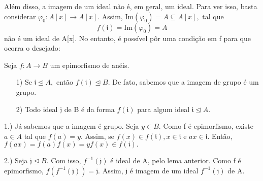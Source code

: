 \documentclass[algebraII_notes.tex]{subfiles}
\begin{document}
Além disso, a imagem de um ideal não é, em geral, um ideal. Para ver isso, basta considerar \(\varphi_{0}:A[x]\rightarrow A[x].\)
Assim, \(\mathrm{Im}(\varphi_{0}) = A\subseteq A[x],\) tal que
\[
	f(\mathfrak{i}) = \mathrm{Im}(\varphi_{0}) = A
\]
não é um ideal de A[x]. No entanto, é possível pôr uma condição em f para que ocorra o desejado:
\begin{lemma*}
	Seja \(f:A\rightarrow B\) um epimorfismo de anéis.
	\begin{itemize}
		\item[1)] Se \(\mathfrak{i}\trianglelefteq{A},\) então \(f(\mathfrak{i})\trianglelefteq{B}.\) De fato, sabemos que a imagem
		      de grupo é um grupo.
		\item[2)] Todo ideal \(\mathfrak{j}\) de B é da forma \(f(\mathfrak{i})\) para algum ideal \(\mathfrak{i}\trianglelefteq{A}.\)
	\end{itemize}
\end{lemma*}
\begin{proof*}
	1.) Já sabemos que a imagem é grupo. Seja \(y\in B.\) Como f é epimorfismo, existe
	\(a\in A\) tal que \(f(a) = y.\) Assim, se \(f(x)\in f(\mathfrak{i}), x\in \mathfrak{i}\) e
	\(ax\in \mathfrak{i}.\) Então, \(f(ax) = f(a)f(x) = y f(x)\in f(\mathfrak{i}).\)

	2.) Seja \(\mathfrak{j}\trianglelefteq{B}.\) Com isso, \(f^{-1}(\mathfrak{j})\) é ideal de A, pelo lema anterior.
	Como f é epimorfismo, \(f(f^{-1}(\mathfrak{j})) = \mathfrak{j}.\) Assim, \(\mathfrak{j}\) é imagem de um ideal
	\(f^{-1}(\mathfrak{j})\) de A. \qedsymbol
\end{proof*}
\end{document}
